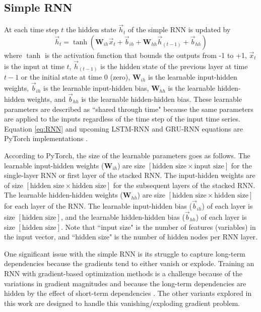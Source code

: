 \subsection{Simple RNN}
At each time step $t$ the hidden state $\vec{h}_{t}$ of the simple \ac{RNN} is updated by
\begin{equation} \label{eq:RNN}
	\vec{h}_{t} = \tanh\left(\textbf{W}_{ih} \vec{x}_{t} + \vec{b}_{ih} + \textbf{W}_{hh} \vec{h}_{\left(t-1\right)} + \vec{b}_{hh}\right)
\end{equation}
where $\tanh$ is the activation function that bounds the outputs from -1 to +1, $\vec{x}_{t}$ is the input at time $t$, $\vec{h}_{\left(t-1\right)}$ is the hidden state of the previous layer at time $t-1$ or the initial state at time 0 (zero), $\textbf{W}_{ih}$ is the learnable input-hidden weights, $\vec{b}_{ih}$ is the learnable input-hidden bias, $\textbf{W}_{hh}$ is the learnable hidden-hidden weights, and $\vec{b}_{hh}$ is the learnable hidden-hidden bias. These learnable parameters are described as ``shared through time" because the same parameters are applied to the inputs regardless of the time step of the input time series. Equation \ref{eq:RNN} and upcoming \ac{LSTM-RNN} and \ac{GRU-RNN} equations are PyTorch implementations \cite{PyTorch}.

According to PyTorch, the size of the learnable parameters goes as follows. The learnable input-hidden weights ($\textbf{W}_{ih}$) are size $\left[\text{hidden size} \times \text{input size}\right]$ for the single-layer \ac{RNN} or first layer of the stacked \ac{RNN}. The input-hidden weights are of size $\left[\text{hidden size} \times \text{hidden size}\right]$ for the subsequent layers of the stacked \ac{RNN}. The learnable hidden-hidden weights ($\textbf{W}_{hh}$) are size $\left[\text{hidden size} \times \text{hidden size}\right]$ for each layer of the \ac{RNN}. The learnable input-hidden bias ($\vec{b}_{ih}$) of each layer is size $\left[\text{hidden size}\right]$, and the learnable hidden-hidden bias ($\vec{b}_{hh}$) of each layer is size $\left[\text{hidden size}\right]$. Note that ``input size" is the number of features (variables) in the input vector, and ``hidden size" is the number of hidden nodes per \ac{RNN} layer.

One significant issue with the simple \ac{RNN} is its struggle to capture long-term dependencies because the gradients tend to either vanish or explode. Training an \ac{RNN} with gradient-based optimization methods is a challenge because of the variations in gradient magnitudes and because the long-term dependencies are hidden by the effect of short-term dependencies \cite{GRU}. The other variants explored in this work are designed to handle this vanishing/exploding gradient problem.

